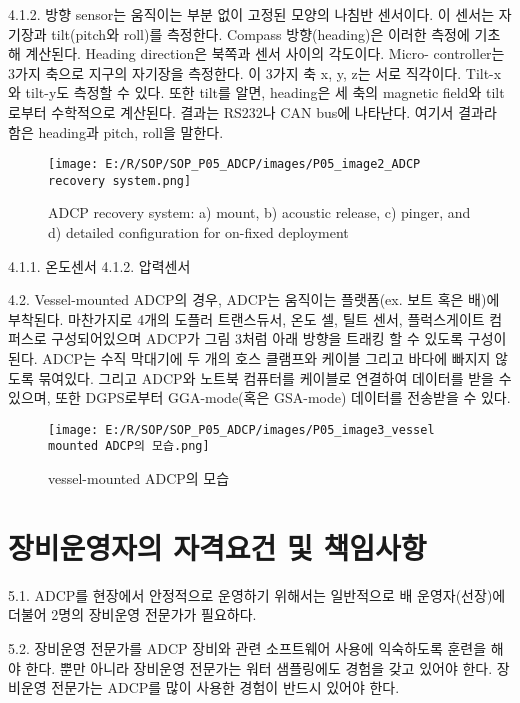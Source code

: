 \documentclass[
]{book}
\begin{document}
4.1.2. 방향 sensor는 움직이는 부분 없이 고정된 모양의 나침반 센서이다. 이 센서는 자기장과 tilt(pitch와 roll)를 측정한다. Compass 방향(heading)은 이러한 측정에 기초해 계산된다. Heading direction은 북쪽과 센서 사이의 각도이다. Micro- controller는 3가지 축으로 지구의 자기장을 측정한다. 이 3가지 축 x, y, z는 서로 직각이다. Tilt-x와 tilt-y도 측정할 수 있다. 또한 tilt를 알면, heading은 세 축의 magnetic field와 tilt로부터 수학적으로 계산된다. 결과는 RS232나 CAN bus에 나타난다. 여기서 결과라 함은 heading과 pitch, roll을 말한다.

\begin{figure}
\centering
\texttt{[image: E:/R/SOP/SOP\_P05\_ADCP/images/P05\_image2\_ADCP recovery system.png]}
\caption{ADCP recovery system: a) mount, b) acoustic release, c) pinger, and d) detailed configuration for on-fixed deployment}
\end{figure}

4.1.1. 온도센서
4.1.2. 압력센서

4.2. Vessel-mounted ADCP의 경우, ADCP는 움직이는 플랫폼(ex. 보트 혹은 배)에 부착된다. 마찬가지로 4개의 도플러 트랜스듀서, 온도 셀, 틸트 센서, 플럭스게이트 컴퍼스로 구성되어있으며 ADCP가 그림 3처럼 아래 방향을 트래킹 할 수 있도록 구성이 된다. ADCP는 수직 막대기에 두 개의 호스 클램프와 케이블 그리고 바다에 빠지지 않도록 묶여있다. 그리고 ADCP와 노트북 컴퓨터를 케이블로 연결하여 데이터를 받을 수 있으며, 또한 DGPS로부터 GGA-mode(혹은 GSA-mode) 데이터를 전송받을 수 있다.

\begin{figure}
\centering
\texttt{[image: E:/R/SOP/SOP\_P05\_ADCP/images/P05\_image3\_vessel mounted ADCP의 모습.png]}
\caption{vessel-mounted ADCP의 모습}
\end{figure}

\hypertarget{uxc7a5uxbe44uxc6b4uxc601uxc790uxc758-uxc790uxaca9uxc694uxac74-uxbc0f-uxcc45uxc784uxc0acuxd56d}{%
\section{장비운영자의 자격요건 및 책임사항}\label{uxc7a5uxbe44uxc6b4uxc601uxc790uxc758-uxc790uxaca9uxc694uxac74-uxbc0f-uxcc45uxc784uxc0acuxd56d}}

5.1. ADCP를 현장에서 안정적으로 운영하기 위해서는 일반적으로 배 운영자(선장)에 더불어 2명의 장비운영 전문가가 필요하다.

5.2. 장비운영 전문가를 ADCP 장비와 관련 소프트웨어 사용에 익숙하도록 훈련을 해야 한다. 뿐만 아니라 장비운영 전문가는 워터 샘플링에도 경험을 갖고 있어야 한다. 장비운영 전문가는 ADCP를 많이 사용한 경험이 반드시 있어야 한다.
\end{document}
